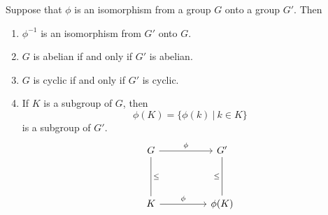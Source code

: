 \begin{theorem}
    Suppose that $\phi$ is an isomorphism from a group $G$ onto a group $G'$. Then 
    \begin{enumerate}
        \item $\phi^{-1}$ is an isomorphism from $G'$ onto $G$.
        \item $G$ is abelian if and only if $G'$ is abelian.
        \item $G$ is cyclic if and only if $G'$ is cyclic.
        \item If $K$ is a subgroup of $G$, then 
        \[
            \phi(K) = \{ \phi(k) \> | \> k \in K \} 
        \]
        is a subgroup of $G'$.
        \[
        \begin{tikzcd}[row sep=2.0em]
            G \arrow["\phi"]{rr} \arrow[dash, "\leq"]{dd} & & G' \\
            \\
            K \arrow["\phi"]{rr} & & \phi(K) \arrow[dash, "\leq"]{uu}
        \end{tikzcd}
        \]
    \end{enumerate}
\end{theorem}
